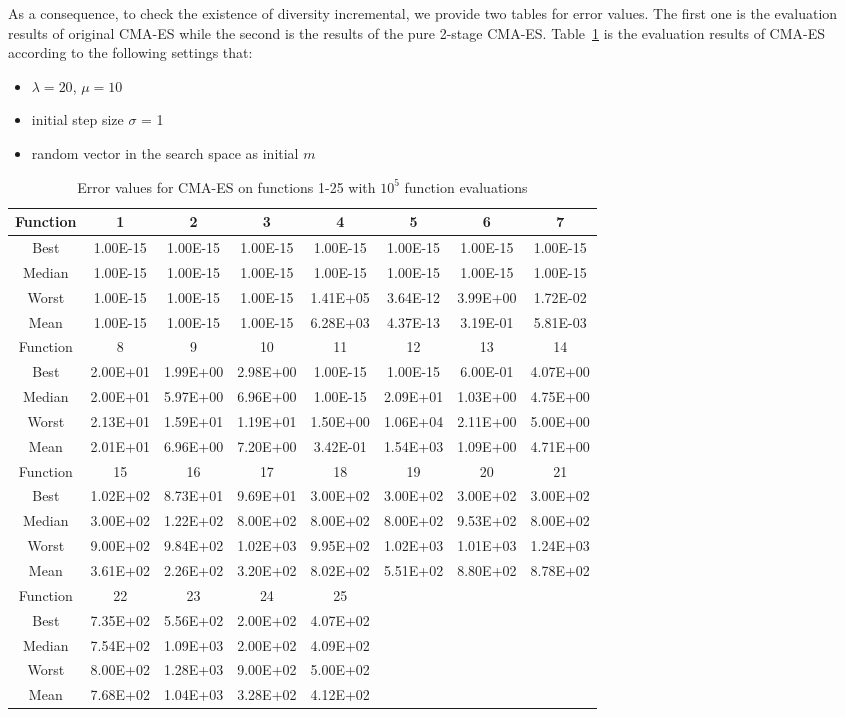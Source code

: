 As a consequence, to check the existence of diversity incremental,
we provide two tables for error values. The first one is the evaluation
results of original CMA-ES while the second is the results of the pure
2-stage CMA-ES.
Table~\ref{table:errorCMAES} is the evaluation results of CMA-ES
according to the following settings that:
\begin{itemize}
  \item{$\lambda = 20$, $\mu = 10$}
  \item{initial step size $\sigma$ = 1}
  \item{random vector in the search space as initial $m$}
\end{itemize}  
\begin{table}[h]
\footnotesize
  \centering
\begin{tabular}{@{}cccccccc@{}}
\toprule
Function&1       &2       &3       &4       &5       &6       &7     \\ \midrule
Best    &1.00E-15&1.00E-15&1.00E-15&1.00E-15&1.00E-15&1.00E-15&1.00E-15 \\
Median  &1.00E-15&1.00E-15&1.00E-15&1.00E-15&1.00E-15&1.00E-15&1.00E-15\\
Worst   &1.00E-15&1.00E-15&1.00E-15&1.41E+05&3.64E-12&3.99E+00&1.72E-02\\
Mean    &1.00E-15&1.00E-15&1.00E-15&6.28E+03&4.37E-13&3.19E-01&5.81E-03\\\midrule
Function&8       &9       &10      &11      &12      &13      &14      \\\midrule
Best    &2.00E+01&1.99E+00&2.98E+00&1.00E-15&1.00E-15&6.00E-01&4.07E+00\\
Median  &2.00E+01&5.97E+00&6.96E+00&1.00E-15&2.09E+01&1.03E+00&4.75E+00 \\
Worst   &2.13E+01&1.59E+01&1.19E+01&1.50E+00&1.06E+04&2.11E+00&5.00E+00\\
Mean    &2.01E+01&6.96E+00&7.20E+00&3.42E-01&1.54E+03&1.09E+00&4.71E+00\\\midrule
Function&15      &16      &17      &18      &19      &20      &21\\\midrule
Best    &1.02E+02&8.73E+01&9.69E+01&3.00E+02&3.00E+02&3.00E+02&3.00E+02\\
Median  &3.00E+02&1.22E+02&8.00E+02&8.00E+02&8.00E+02&9.53E+02&8.00E+02\\
Worst   &9.00E+02&9.84E+02&1.02E+03&9.95E+02&1.02E+03&1.01E+03&1.24E+03\\
Mean    &3.61E+02&2.26E+02&3.20E+02&8.02E+02&5.51E+02&8.80E+02&8.78E+02\\\midrule
Function&22      &23      &24      &25&&&\\\midrule
Best    &7.35E+02&5.56E+02&2.00E+02&4.07E+02&&&\\
Median  &7.54E+02&1.09E+03&2.00E+02&4.09E+02&&&\\
Worst   &8.00E+02&1.28E+03&9.00E+02&5.00E+02&&&\\
Mean    &7.68E+02&1.04E+03&3.28E+02&4.12E+02&&&\\\bottomrule
\end{tabular}
\caption{Error values for CMA-ES on functions 1-25 with $10^5$ function evaluations}
\label{table:errorCMAES}
\end{table}

